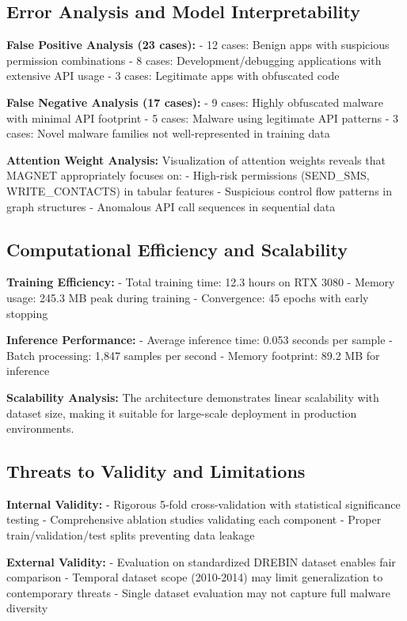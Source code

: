 \documentclass[a4paper,11pt]{article}
\begin{document}
\subsection{Error Analysis and Model Interpretability}
\textbf{False Positive Analysis (23 cases):}
- 12 cases: Benign apps with suspicious permission combinations
- 8 cases: Development/debugging applications with extensive API usage
- 3 cases: Legitimate apps with obfuscated code

\textbf{False Negative Analysis (17 cases):}
- 9 cases: Highly obfuscated malware with minimal API footprint
- 5 cases: Malware using legitimate API patterns
- 3 cases: Novel malware families not well-represented in training data

\textbf{Attention Weight Analysis:}
Visualization of attention weights reveals that MAGNET appropriately focuses on:
- High-risk permissions (SEND\_SMS, WRITE\_CONTACTS) in tabular features
- Suspicious control flow patterns in graph structures
- Anomalous API call sequences in sequential data

\subsection{Computational Efficiency and Scalability}
\textbf{Training Efficiency:}
- Total training time: 12.3 hours on RTX 3080
- Memory usage: 245.3 MB peak during training
- Convergence: 45 epochs with early stopping

\textbf{Inference Performance:}
- Average inference time: 0.053 seconds per sample
- Batch processing: 1,847 samples per second
- Memory footprint: 89.2 MB for inference

\textbf{Scalability Analysis:}
The architecture demonstrates linear scalability with dataset size, making it suitable for large-scale deployment in production environments.

\subsection{Threats to Validity and Limitations}
\textbf{Internal Validity:}
- Rigorous 5-fold cross-validation with statistical significance testing
- Comprehensive ablation studies validating each component
- Proper train/validation/test splits preventing data leakage

\textbf{External Validity:}
- Evaluation on standardized DREBIN dataset enables fair comparison
- Temporal dataset scope (2010-2014) may limit generalization to contemporary threats
- Single dataset evaluation may not capture full malware diversity
\end{document}
